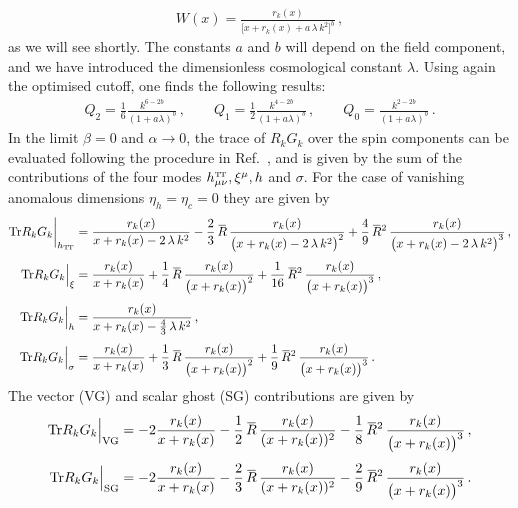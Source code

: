 \documentclass[11pt]{book}
\newcommand{\overbar}[1]{\mkern 1.5mu\overline{\mkern-1.5mu#1\mkern-1.5mu}\mkern 1.5mu}
\newcommand\TTspace{ -1pt }
\newcommand\hTT{ h_{\scriptscriptstyle{\mathrm{T\hspace{\TTspace}T}}} }
\newcommand\hTTmunu{ h^{\scriptscriptstyle{\mathrm{T\hspace{\TTspace}T}}}_{\mu\nu} }
\newcommand{\bR}{\overbar R}
\newcommand{\Tr}{\mathrm{Tr}}
\numberwithin{equation}{chapter}
\begin{document}
\begin{appendices}
\begin{align}
  W(x) = \frac{ r_k(x) }{ \big[ x+r_k(x)+a \, \lambda \, k^2 \big]^b } \,,
\end{align}
as we will see shortly. The constants $a$ and $b$ will depend
on the field component, and we have introduced the dimensionless
cosmological constant $\lambda$.
Using again the optimised cutoff, one finds the following results:
\begin{align}
  Q_2 = \frac 16 \frac {k^{6-2b}}{(1 + a \lambda)^b} \,, \qquad
  Q_1 = \frac 12 \frac {k^{4-2b}}{(1 + a \lambda)^b} \,, \qquad
  Q_0 = \frac {k^{2-2b}}{(1 + a \lambda)^b} \,.
\end{align}
In the limit $\beta = 0$ and $\alpha \rightarrow 0$,
the trace of $R_k G_k$ over the spin components
can be evaluated following the procedure in Ref.~\cite{Gies:2015tca},
and is given by the sum of the contributions
of the four modes $\hTTmunu, \xi^{\mu}, h$ and $\sigma$.
For the case of vanishing anomalous dimensions $\eta_h=\eta_c=0$
they are given by
\begin{align}
  \Tr R_k G_k \bigg|_{\hTT}
  &= \frac{r_k(x)}{x+r_k(x) - 2 \, \lambda \, k^2}
  - \frac 23 \, \bR \, \frac{r_k(x)}{ \big( x+r_k(x) - 2 \, \lambda \, k^2 \big) ^2}
  + \frac 49 \, \bR^2 \, \frac{r_k(x)}{ \big( x+r_k(x) - 2 \, \lambda \, k^2 \big) ^3} \,,
  \\[3pt]
  \Tr R_k G_k \Big|_{\xi}
  &= \frac{r_k(x)}{x+r_k(x)} + \frac 14 \, \bR \, \frac{r_k(x)}{ \big( x+r_k(x) \big) ^2}
  + \frac{1}{16} \, \bR^2 \, \frac{r_k(x)}{ \big( x+r_k(x) \big) ^3} \,,
  \\[3pt]
  \Tr R_k G_k \Big|_{h}
  &= \frac{r_k(x)}{x+r_k(x) - \frac 43 \, \lambda \, k^2} \,,
  \\[3pt]
  \Tr R_k G_k \Big|_{\sigma}
  &= \frac{r_k(x)}{x+r_k(x)} + \frac 13 \, \bR \, \frac{r_k(x)}{ \big( x+r_k(x) \big) ^2}
  + \frac{1}{9} \, \bR^2 \, \frac{r_k(x)}{ \big( x+r_k(x) \big) ^3} \,.
\end{align}
The vector (VG) and scalar ghost (SG) contributions are given by
\begin{align}
  \Tr R_k G_k \Big|_{\mathrm{VG}}
  &= - 2 \frac{r_k(x)}{x+r_k(x)} - \frac 12 \, \bR \, \frac{r_k(x)}{(x+r_k(x)) ^2}
  - \frac{1}{8} \, \bR^2 \, \frac{r_k(x)}{ \big( x+r_k(x) \big) ^3} \,, \\[3pt]
  \Tr R_k G_k \Big|_{\mathrm{SG}}
  &= - 2 \frac{r_k(x)}{x+r_k(x)} - \frac 23 \, \bR \, \frac{r_k(x)}{(x+r_k(x)) ^2}
  - \frac{2}{9} \, \bR^2 \, \frac{r_k(x)}{ \big( x+r_k(x) \big) ^3} \,.
\end{align}

\end{appendices}
\end{document}
